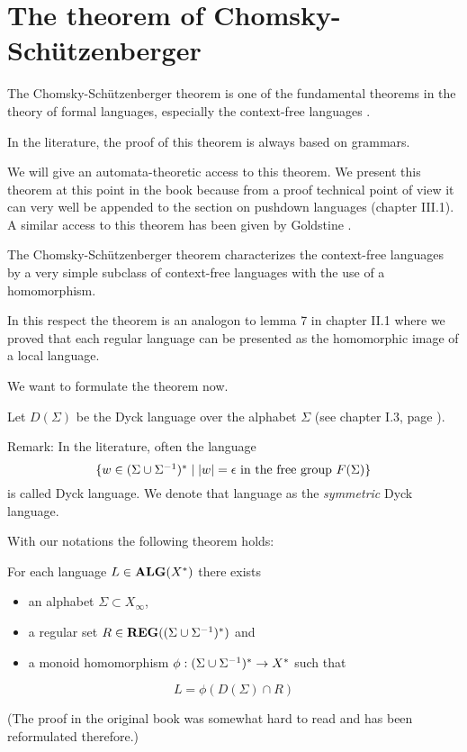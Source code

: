 \section{The theorem of Chomsky-Schützenberger}

The Chomsky-Schützenberger theorem is one of the fundamental theorems in the
theory of formal languages, especially the context-free languages \cite{ChSch}.

In the literature, the proof of this theorem is always based on grammars.

We will give an automata-theoretic access to this theorem. We present this
theorem at this point in the book because from a proof technical point of
view it can very well be appended to the section on pushdown languages
(chapter III.1). A similar access to this theorem has been given by Goldstine
 \cite{Goldstine77,Goldstine79,Goldstine80}.

The Chomsky-Schützenberger theorem characterizes the context-free languages
by a very simple subclass of context-free languages with the use of a
homomorphism.

In this respect the theorem is an analogon to lemma 7 in chapter II.1 where we
proved that each regular language can be presented as the homomorphic image of
a local language.

We want to formulate the theorem now.

Let $D(\Sigma)$ be the Dyck language over the alphabet $\Sigma$ (see chapter
I.3, page \pageref{dyck-language}).

Remark: In the literature, often the language \[ \mbox{$\{w\in
(\Sigma \cup {\Sigma}^{-1})^* \mid |w|= \epsilon\text{ in the free group }F(\Sigma)\}$} \]
is called Dyck language. We denote that language as the {\em symmetric} Dyck
language.

With our notations the following theorem holds:
\begin{theorem} For each language $L\in \mbox{{\bf ALG}}(X^*)$
there exists
\begin{itemize}
  \item[] an alphabet $\Sigma \subset X_\infty$,
  \item[] a regular set $R\in \mbox{{\bf REG}}((\Sigma \cup {\Sigma}^{-1})^*)$ and
  \item[] a monoid homomorphism $\phi: (\Sigma \cup {\Sigma}^{-1})^* \to X^*$ such that
\end{itemize}
\[ L = \phi(D(\Sigma)\cap R) \]
\end{theorem}

(The proof in the original book was somewhat hard to read and has been
reformulated therefore.)

